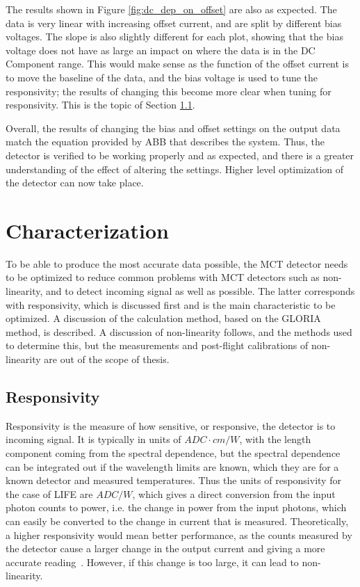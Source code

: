 The results shown in Figure \ref{fig:dc_dep_on_offset} are also as expected. The data is very linear with increasing offset current, and are split by different bias voltages. The slope is also slightly different for each plot, showing that the bias voltage does not have as large an impact on where the data is in the DC Component range. This would make sense as the function of the offset current is to move the baseline of the data, and the bias voltage is used to tune the responsivity; the results of changing this become more clear when tuning for responsivity. This is the topic of Section \ref{responsivity_sec}.

Overall, the results of changing the bias and offset settings on the output data match the equation provided by ABB that describes the system. Thus, the detector is verified to be working properly and as expected, and there is a greater understanding of the effect of altering the settings. Higher level optimization of the detector can now take place.

\section{Characterization}\label{detector_char}
To be able to produce the most accurate data possible, the MCT detector needs to be optimized to reduce common problems with MCT detectors such as non-linearity, and to detect incoming signal as well as possible. The latter corresponds with responsivity, which is discussed first and is the main characteristic to be optimized. A discussion of the calculation method, based on the GLORIA method, is described. A discussion of non-linearity follows, and the methods used to determine this, but the measurements and post-flight calibrations of non-linearity are out of the scope of thesis.

\subsection{Responsivity}\label{responsivity_sec}
Responsivity is the measure of how sensitive, or responsive, the detector is to incoming signal. It is typically in units of $ADC\cdot cm/W$, with the length component coming from the spectral dependence, but the spectral dependence can be integrated out if the wavelength limits are known, which they are for a known detector and measured temperatures. Thus the units of responsivity for the case of LIFE are $ADC/W$, which gives a direct conversion from the input photon counts to power, i.e. the change in power from the input photons, which can easily be converted to the change in current that is measured. Theoretically, a higher responsivity would mean better performance, as the counts measured by the detector cause a larger change in the output current and giving a more accurate reading~\citep{GLORIA_PhD}. However, if this change is too large, it can lead to non-linearity.

